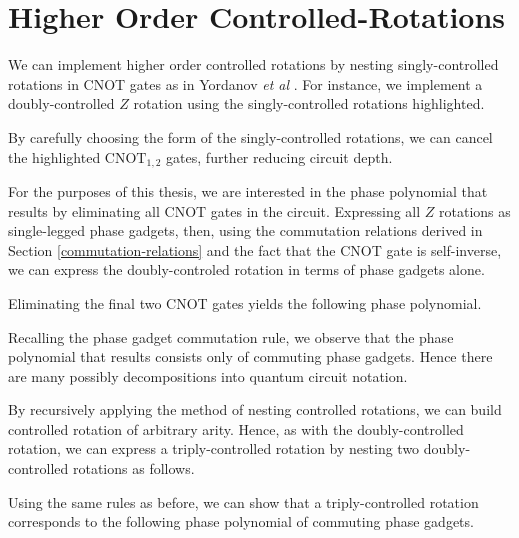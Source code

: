 \section{Higher Order Controlled-Rotations}

We can implement higher order controlled rotations by nesting singly-controlled rotations in CNOT gates as in Yordanov \textit{et al} \cite{Yordanov2020}. For instance, we implement a doubly-controlled $Z$ rotation using the singly-controlled rotations highlighted.


By carefully choosing the form of the singly-controlled rotations, we can cancel the highlighted $\text{CNOT}_{1, 2}$ gates, further reducing circuit depth.


For the purposes of this thesis, we are interested in the phase polynomial that results by eliminating all CNOT gates in the circuit. Expressing all $Z$ rotations as single-legged phase gadgets, then, using the commutation relations derived in Section \ref{commutation-relations} and the fact that the CNOT gate is self-inverse, we can express the doubly-controled rotation in terms of phase gadgets alone.


Eliminating the final two CNOT gates yields the following phase polynomial.


Recalling the phase gadget commutation rule, we observe that the phase polynomial that results consists only of commuting phase gadgets. Hence there are many possibly decompositions into quantum circuit notation.

By recursively applying the method of nesting controlled rotations, we can build controlled rotation of arbitrary arity. Hence, as with the doubly-controlled rotation, we can express a triply-controlled rotation by nesting two doubly-controlled rotations as follows.


Using the same rules as before, we can show that a triply-controlled rotation corresponds to the following phase polynomial of commuting phase gadgets.
